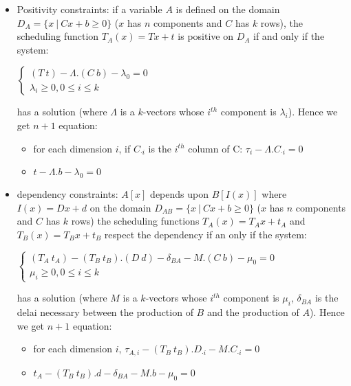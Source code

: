 \begin{itemize}
\item Positivity constraints: if a variable $A$ is defined on the domain
$D_A=\{x ~|~ Cx + b \geq 0 \}$ ($x$ has $n$ components and $C$ has 
$k$ rows), the scheduling function 
$T_A(x) = Tx+ t$ is positive on $D_A$ if and only if the system: \\
\centerline{
$\left\{\begin{array}{l} (T\ t) - \Lambda.(C\ b) - \lambda_0 = 0   \\
\lambda_i \geq 0, 0 \leq i \leq k\end{array}\right.$
}
has a solution (where $\Lambda$ is a $k$-vectors whose $i^{th}$ component 
is $\lambda_i$). Hence we get $n+1$ equation: 
\begin{itemize}
\item for each dimension $i$, if $C_{\cdot i}$ is the $i^{th}$ 
column of C:  $\tau_i   - \Lambda.C_{\cdot i} = 0$
\item $t -  \Lambda.b - \lambda_0 = 0$
\end{itemize}

\item dependency constraints: $A[x]$ depends upon $B[I(x)]$ where 
$I(x) = Dx+d$ on the domain $D_{AB} = \{x ~|~ Cx + b \geq 0 \}$
($x$ has $n$ components and $C$ has $k$ rows) the scheduling functions 
$T_A(x) = T_Ax+ t_A$ and  $T_B(x) = T_Bx+ t_B$ respect the dependency 
if an only if the system:\\
\centerline{
$\left\{\begin{array}{l} (T_A\ t_A) - (T_B \ t_B).(D \ d) -  \delta_{BA} - M.(C\ b) - \mu_0 = 0   \\
\mu_i \geq 0, 0 \leq i \leq k\end{array}\right.$
}
has a solution (where $M$ is a $k$-vectors whose $i^{th}$ component 
is $\mu_i$, $\delta_{BA}$ is the delai necessary between the production of $B$ and the production of $A$). Hence we get $n+1$ equation: 
\begin{itemize}
\item  for each dimension $i$,  $\tau_{A,i}   - (T_B \ t_B).D_{\cdot i} - 
M.C_{\cdot i} = 0$
\item $t_A -  (T_B \ t_B).d -\delta_{BA}- M.b - \mu_0 = 0$
\end{itemize}


\end{itemize}
